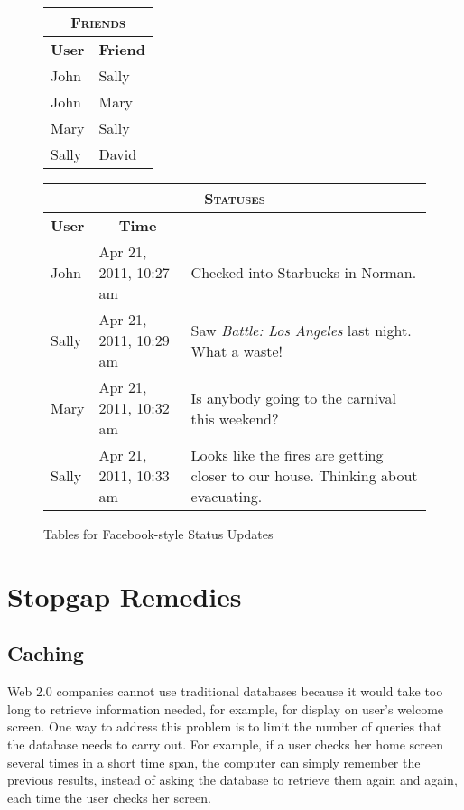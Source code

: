 \begin{figure}
	\begin{center}
		\begin{tabular}[t]{ll}
			\hline
			\multicolumn{2}{c}{\textsc{Friends}} \\
			\hline
			\multicolumn{1}{c}{\textbf{User}} & \multicolumn{1}{c}{\textbf{Friend}} \\
			\hline
			John  & Sally \\
			John  & Mary \\
			Mary  & Sally \\
			Sally & David \\
			\hline
		\end{tabular}
		\hspace{.5in}
		\begin{tabular}[t]{ll>{\raggedright}p{1in}}
			\hline
			\multicolumn{3}{c}{\textsc{Statuses}} \\
			\hline
			\multicolumn{1}{c}{\textbf{User}} & \multicolumn{1}{c}{\textbf{Time}} & \multicolumn{1}{c}{\textbf{Status}} \\
			\hline
			John  & Apr 21, 2011, 10:27 am & Checked into Starbucks in Norman. \tabularnewline
			Sally & Apr 21, 2011, 10:29 am & Saw \emph{Battle: Los Angeles} last night.  What a waste! \tabularnewline
			Mary  & Apr 21, 2011, 10:32 am & Is anybody going to the carnival this weekend? \tabularnewline
			Sally & Apr 21, 2011, 10:33 am & Looks like the fires are getting closer to our house.  Thinking about evacuating. \tabularnewline
			\hline
		\end{tabular}
	\end{center}
	\caption{Tables for Facebook-style Status Updates}
	\label{facebook-tables}
\end{figure}

\section{Stopgap Remedies}

\subsection{Caching}

Web 2.0 companies cannot use traditional databases 
because it would take too long to retrieve information needed,
for example, for display on user's welcome screen. 
One way to address this problem is to limit the number of queries that the
database needs to carry out.
For example, if a user checks her home screen several times in a short time span,
the computer can simply remember the previous results, instead of asking the database to
retrieve them again and again, each time the user checks her screen.

